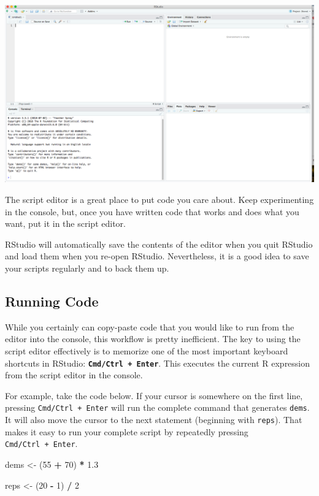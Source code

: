 \documentclass[
]{book}
\newenvironment{Shaded}{\begin{snugshade}}{\end{snugshade}}
\newcommand{\DecValTok}[1]{\textcolor[rgb]{0.00,0.00,0.81}{#1}}
\newcommand{\FloatTok}[1]{\textcolor[rgb]{0.00,0.00,0.81}{#1}}
\newcommand{\NormalTok}[1]{#1}
\newcommand{\OperatorTok}[1]{\textcolor[rgb]{0.81,0.36,0.00}{\textbf{#1}}}
\newcommand{\StringTok}[1]{\textcolor[rgb]{0.31,0.60,0.02}{#1}}
\begin{document}
\begin{center}\includegraphics[width=0.7\linewidth]{img/4-panes} \end{center}

The script editor is a great place to put code you care about. Keep experimenting in the console, but, once you have written code that works and does what you want, put it in the script editor.

RStudio will automatically save the contents of the editor when you quit RStudio and load them when you re-open RStudio. Nevertheless, it is a good idea to save your scripts regularly and to back them up.

\hypertarget{running-code}{%
\subsection{Running Code}\label{running-code}}

While you certainly can copy-paste code that you would like to run from the editor into the console, this workflow is pretty inefficient. The key to using the script editor effectively is to memorize one of the most important keyboard shortcuts in RStudio: \textbf{\texttt{Cmd/Ctrl\ +\ Enter}}. This executes the current R expression from the script editor in the console.

For example, take the code below. If your cursor is somewhere on the first line, pressing \texttt{Cmd/Ctrl\ +\ Enter} will run the complete command that generates \texttt{dems}. It will also move the cursor to the next statement (beginning with \texttt{reps}). That makes it easy to run your complete script by repeatedly pressing \texttt{Cmd/Ctrl\ +\ Enter}.

\begin{Shaded}
\begin{Highlighting}[]
\NormalTok{dems <-}\StringTok{ }\NormalTok{(}\DecValTok{55} \OperatorTok{+}\StringTok{ }\DecValTok{70}\NormalTok{) }\OperatorTok{*}\StringTok{ }\FloatTok{1.3}

\NormalTok{reps <-}\StringTok{ }\NormalTok{(}\DecValTok{20} \OperatorTok{-}\StringTok{ }\DecValTok{1}\NormalTok{) }\OperatorTok{/}\StringTok{ }\DecValTok{2}
\end{Highlighting}
\end{Shaded}
\end{document}
